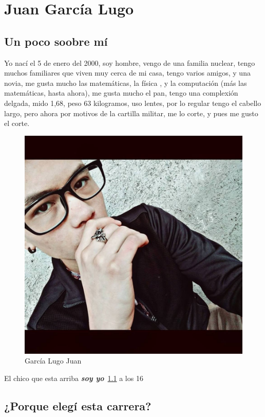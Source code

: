 
\chapter{Juan García Lugo}

\section{Un poco soobre mí}

Yo nací el 5 de enero del 2000, soy hombre, vengo de una familia nuclear, tengo muchos familiares que viven muy cerca de mi casa, tengo varios amigos, y una novia, me gusta mucho las matemáticas, la física , y la computación (más las matemáticas, hasta ahora), me gusta mucho el pan, tengo una complexión delgada, mido 1,68, peso 63 kilogramos, uso lentes, por lo regular tengo el cabello largo, pero ahora por motivos de la cartilla militar, me lo corte, y pues me gusto el corte.

\begin{figure}[h]
  \centering
  \includegraphics[scale=0.125]{IMG/18.jpg}
  \caption{García Lugo Juan}
  \label{foto:juan}
\end{figure}

El chico que esta arriba \emph{\textbf{soy yo}}~\ref{foto:juan} a los 16   
\section{¿Porque elegí esta carrera?}

